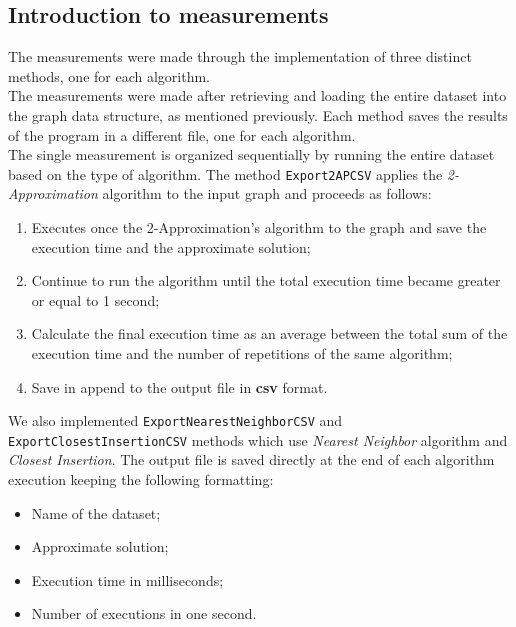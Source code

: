 \subsection{Introduction to measurements}
The measurements were made through the implementation of three distinct methods, one for each algorithm. \\ \noindent
The measurements were made after retrieving and loading the entire dataset into the graph data structure, as mentioned 
previously. Each method saves the results of the program in a different file, one for each algorithm.\\
\noindent
The single measurement is organized sequentially by running the entire dataset based on the type of algorithm. 
The method \verb|Export2APCSV| applies the \textit{2-Approximation} algorithm to the input graph and proceeds as follows:
\begin{enumerate}
    \item Executes once the 2-Approximation's algorithm to the graph and save the execution time and the approximate solution;
    \item Continue to run the algorithm until the total execution time became greater or equal to 1 second;
    \item Calculate the final execution time as an average between the total sum of the execution time and the number of repetitions of the same algorithm;
    \item Save in append to the output file in \textbf{csv} format.
\end{enumerate}
We also implemented \verb|ExportNearestNeighborCSV| and \verb|ExportClosestInsertionCSV| methods which use \textit{Nearest Neighbor} algorithm and \textit{Closest Insertion}.
\noindent
The output file is saved directly at the end of each algorithm execution keeping the following formatting:
\begin{itemize}
    \item Name of the dataset;
    \item Approximate solution;
    \item Execution time in milliseconds;
    \item Number of executions in one second.
\end{itemize}